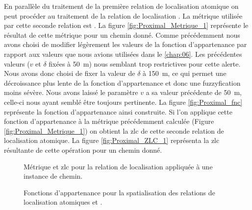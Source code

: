 En parallèle du traitement de la première relation de localisation
atomique on peut procéder au traitement de la relation de localisation
. La métrique utilisée par cette seconde relation
est . La figure
\ref{fig:Proximal_Metrique_1} représente le résultat de cette métrique
pour un chemin donné. Comme précédemment nous avons choisi de modifier
légèrement les valeurs de la fonction d'appartenance par rapport aux
valeurs que nous avions utilisées dans le \autoref{chap:06}. Les
précédentes valeurs (\(v\) et \(\delta\) fixées à \SI{50}{\meter})
nous semblant trop restrictives pour cette alerte. Nous avons donc
choisi de fixer la valeur de \(\delta\) à \SI{150}{\meter}, ce qui
permet une décroissance plus lente de la fonction d'appartenance et
donc une fuzzyfication moins sévère. Nous avons laissé le paramètre
\(v\) a sa valeur précédente de \SI{50}{\meter}, celle-ci nous ayant
semblé être toujours pertinente. La figure \ref{fig:Proximal_fnc}
représente la fonction d'appartenance ainsi construite. Si l'on
applique cette fonction d'appartenance à la métrique précédemment
calculée (Figure \ref{fig:Proximal_Metrique_1}) on obtient la \ac{zlc}
de cette seconde relation de localisation atomique. La figure
\ref{fig:Proximal_ZLC_1} représenta la \ac{zlc} résultante de cette
opération pour un chemin donné.

\begin{figure}
  \centering
  
  \caption{Métrique \protect{} et
    \ac{zlc} \protect{} pour la relation de
    localisation \protect{} appliquée à une
    instance de chemin.}
  \label{fig:Proximal_1}
\end{figure}

\begin{figure}
  \centering
  \subfloat[\label{fig:SousAlt_fnc}]{%
    }\hspace{1cm}
  \subfloat[\label{fig:Proximal_fnc}]{%
}
  \caption{Fonctions d'appartenance pour la spatialisation des
relations de localisation atomiques
\protect{} \protect{}
et \protect{}
\protect{}.}
  \label{fig:SousProche_fnc}
\end{figure}

